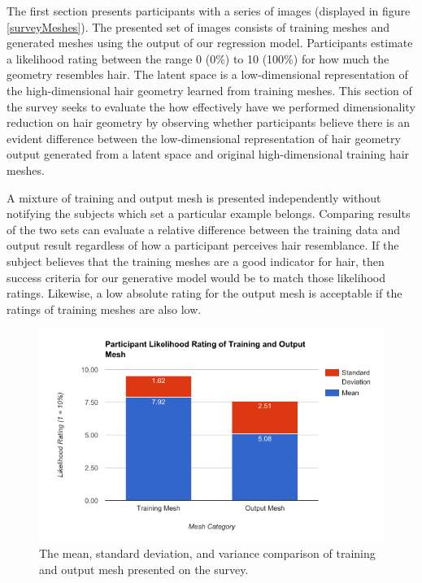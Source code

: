 \documentclass[ %
author={Dillon Keith Diep},
supervisor={Dr. Carl Henrik Ek},
degree={MEng},
title={ART-CG Hair:},
subtitle={Assisted Real-time Content Generation of Stylised Virtual Hair},
type={Research},
year={2017} ]{dissertation}
\begin{document}
	The first section presents participants with a series of images (displayed in figure \ref{surveyMeshes}). The presented set of images consists of training meshes and generated meshes using the output of our regression model. Participants estimate a likelihood rating between the range 0 (0\%) to 10 (100\%) for how much the geometry resembles hair. 
	The latent space is a low-dimensional representation of the high-dimensional hair geometry learned from training meshes. This section of the survey seeks to evaluate the how effectively have we performed dimensionality reduction on hair geometry by observing whether participants believe there is an evident difference between the low-dimensional representation of hair geometry output generated from a latent space and original high-dimensional training hair meshes. 
	
	A mixture of training and output mesh is presented independently without notifying the subjects which set a particular example belongs. Comparing results of the two sets can evaluate a relative difference between the training data and output result regardless of how a participant perceives hair resemblance. If the subject believes that the training meshes are a good indicator for hair, then success criteria for our generative model would be to match those likelihood ratings. Likewise, a low absolute rating for the output mesh is acceptable if the ratings of training meshes are also low.
	
	\begin{figure}[!h]
		\centering
		\includegraphics[scale=0.6]{images/meshRating}
		\caption{The mean, standard deviation, and variance comparison of training and output mesh presented on the survey.}
	\end{figure}
	
\end{document}
